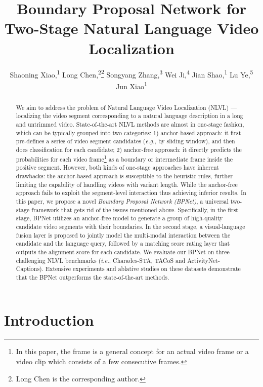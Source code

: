 \documentclass[letterpaper]{article} %
\title{Boundary Proposal Network for Two-Stage Natural Language Video Localization}
\author {
        Shaoning Xiao,\textsuperscript{\rm 1}
        Long Chen,\textsuperscript{\rm 2}\thanks{Long Chen is the corresponding author.}
        Songyang Zhang,\textsuperscript{\rm 3}
        Wei Ji,\textsuperscript{\rm 4}
        Jian Shao,\textsuperscript{\rm 1}
        Lu Ye,\textsuperscript{\rm 5}
        Jun Xiao\textsuperscript{\rm 1} \\
}
\newcommand{\ie}{\emph{i.e.}}
\newcommand{\eg}{\emph{e.g.}}
\begin{document}
\maketitle

\begin{abstract}
We aim to address the problem of Natural Language Video Localization (NLVL) --- localizing the video segment corresponding to 
a natural language description in a long and untrimmed video. 
State-of-the-art NLVL methods are almost in one-stage fashion, which can be typically grouped into two categories:
1) anchor-based approach: it first pre-defines a series of video segment candidates (\eg, by sliding window), and then does classification for each candidate; 
2) anchor-free approach: it directly predicts the probabilities for each video frame\footnote{In this paper, the frame is a general concept for an actual video frame or a video clip which consists of a few consecutive frames.}
as a boundary or intermediate frame inside the positive segment. 
However, both kinds of one-stage approaches have inherent drawbacks: the anchor-based approach is susceptible to the heuristic rules, further limiting the capability of handling videos with variant length.
While the anchor-free approach fails to exploit the segment-level interaction thus achieving inferior results.
In this paper, we propose a novel \emph{Boundary Proposal Network (BPNet)}, a universal two-stage framework that gets rid of the issues mentioned above. 
Specifically, in the first stage, BPNet utilizes an anchor-free model to generate a group of high-quality candidate video segments with their boundaries.
In the second stage, a visual-language fusion layer is proposed to jointly model the multi-modal interaction between the candidate and the language query, followed by a matching score rating layer that outputs the alignment score for each candidate. 
We evaluate our BPNet on three challenging NLVL benchmarks (\ie, Charades-STA, TACoS and ActivityNet-Captions). 
Extensive experiments and ablative studies on these datasets demonstrate that the BPNet outperforms the state-of-the-art methods.
\end{abstract}

\section{Introduction}
\end{document}
